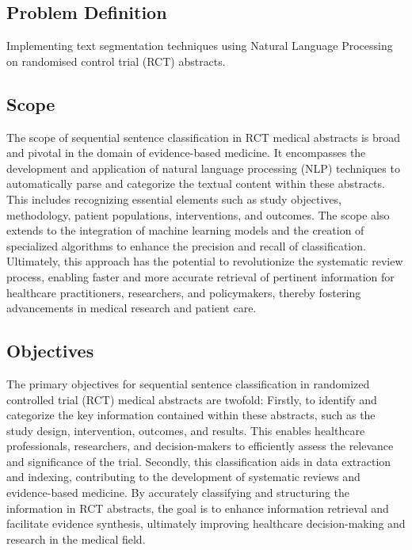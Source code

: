 \documentclass[12pt,a4paper]{report}     %
\begin{document}
\begin{normalsize}
{}

\newpage 
\chapter{}
{\setlength{\baselineskip}{1.1\baselineskip}
\section{Problem Definition}
Implementing text segmentation techniques using Natural Language Processing on randomised control trial (RCT) abstracts.

\section{Scope}
The scope of sequential sentence classification in RCT medical abstracts is broad and pivotal in the domain of evidence-based medicine. It encompasses the development and application of natural language processing (NLP) techniques to automatically parse and categorize the textual content within these abstracts. This includes recognizing essential elements such as study objectives, methodology, patient populations, interventions, and outcomes. The scope also extends to the integration of machine learning models and the creation of specialized algorithms to enhance the precision and recall of classification. Ultimately, this approach has the potential to revolutionize the systematic review process, enabling faster and more accurate retrieval of pertinent information for healthcare practitioners, researchers, and policymakers, thereby fostering advancements in medical research and patient care.
\section{Objectives}
The primary objectives for sequential sentence classification in randomized controlled trial (RCT) medical abstracts are twofold: Firstly, to identify and categorize the key information contained within these abstracts, such as the study design, intervention, outcomes, and results. This enables healthcare professionals, researchers, and decision-makers to efficiently assess the relevance and significance of the trial. Secondly, this classification aids in data extraction and indexing, contributing to the development of systematic reviews and evidence-based medicine. By accurately classifying and structuring the information in RCT abstracts, the goal is to enhance information retrieval and facilitate evidence synthesis, ultimately improving healthcare decision-making and research in the medical field.
}
\end{normalsize}
\end{document}
